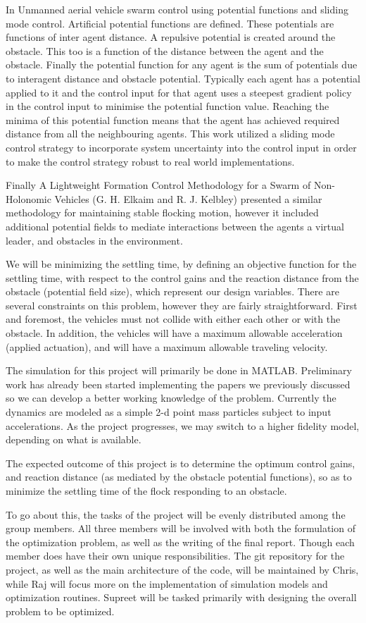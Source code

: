 \documentclass[11pt]{article}
\begin{document}
 In Unmanned aerial vehicle swarm control using potential functions and sliding mode control. Artificial potential functions are defined. These potentials are functions of inter agent distance. A repulsive potential is created around the obstacle. This too is a function of the distance between the agent and the obstacle. Finally the potential function for any agent is the sum of potentials due to interagent distance and obstacle potential. Typically each agent has a potential applied to it and the control input for that agent uses a steepest gradient policy in the control input to minimise the potential function value. Reaching the minima of this potential function means that the agent has achieved required distance from all the neighbouring  agents. 
	This work utilized a sliding mode control strategy to incorporate system uncertainty into the control input in order to make the control strategy robust to real world implementations.

Finally A Lightweight Formation Control Methodology for a Swarm of Non-Holonomic Vehicles (G. H. Elkaim and R. J. Kelbley) presented a similar methodology for maintaining stable flocking motion, however it included additional potential fields to mediate interactions between the agents a virtual leader, and obstacles in the environment.  


We will be minimizing the settling time, by defining an objective function for the settling time, with respect to the control gains and the reaction distance from the obstacle (potential field size), which represent our design variables.  There are several constraints on this problem, however they are fairly straightforward.  First and foremost, the vehicles must not collide with either each other or with the obstacle.  In addition, the vehicles will have a maximum allowable acceleration (applied actuation), and will have a maximum allowable traveling velocity.

The simulation for this project will primarily be done in MATLAB.  Preliminary work has already been started implementing the papers we previously discussed so we can develop a better working knowledge of the problem.  Currently the dynamics are modeled as a simple 2-d point mass particles subject to input accelerations.  As the project progresses, we may switch to a higher fidelity model, depending on what is available.

The expected outcome of this project is to determine the optimum control gains, and reaction distance (as mediated by the obstacle potential functions), so as to minimize the settling time of the flock responding to an obstacle.

To go about this, the tasks of the project will be evenly distributed among the group members.  All three members will be involved with both the formulation of the optimization problem, as well as the writing of the final report.  Though each member does have their own unique responsibilities.  The git repository for the project, as well as the main architecture of the code, will be maintained by Chris, while Raj will focus more on the implementation of simulation models and optimization routines.  Supreet will be tasked primarily with designing the overall problem to be optimized.

\end{document}
